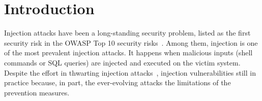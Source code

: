 \vspace{-1em}
\section{Introduction}
\label{sec:intro}
Injection attacks have been a long-standing security problem, listed as the first security risk in the OWASP Top 10 security risks~\cite{owasp_top_ten}. 
Among them,  injection  is one of the most prevalent injection attacks. 
It happens when malicious inputs  (shell commands or SQL queries) are injected and executed on the victim system. 
%
Despite the effort in thwarting injection attacks~\cite{nguyen-tuong-sql,  Haldar_2005, chin_2009, csse, sqlcheck, sqlrand, halfond06fse, halfond_wasp, sekar_ndss, AMNESIA, CANDID, webssari, xie_aiken, pixy, wassermann_2007,wassermann_2008,minamide_2005, noxes, saner_2008},  injection vulnerabilities  still  in practice because, in part, the ever-evolving attacks  the limitations of the prevention measures.

